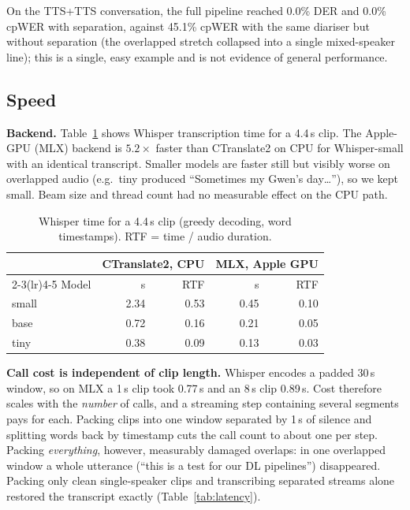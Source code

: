 \documentclass[conference]{IEEEtran}
\begin{document}
On the TTS+TTS conversation, the full pipeline reached 0.0\% DER and 0.0\% cpWER with separation, against 45.1\% cpWER with the same diariser but without separation (the overlapped stretch collapsed into a single mixed-speaker line); this is a single, easy example and is not evidence of general performance.

\subsection{Speed}\label{sec:latency}
\textbf{Backend.} Table~\ref{tab:asr} shows Whisper transcription time for a 4.4\,s clip. The Apple-GPU (MLX) backend is $5.2\times$ faster than CTranslate2 on CPU for Whisper-small with an identical transcript. Smaller models are faster still but visibly worse on overlapped audio (e.g.\ tiny produced ``Sometimes my Gwen's day\ldots''), so we kept small. Beam size and thread count had no measurable effect on the CPU path.

\begin{table}[t]
\caption{Whisper time for a 4.4\,s clip (greedy decoding, word timestamps). RTF = time / audio duration.}
\label{tab:asr}
\centering\footnotesize\setlength{\tabcolsep}{3.5pt}
\begin{tabular}{@{}lrrrr@{}}
\toprule
& \multicolumn{2}{c}{CTranslate2, CPU} & \multicolumn{2}{c}{MLX, Apple GPU} \\
\cmidrule(lr){2-3}\cmidrule(lr){4-5}
Model & s & RTF & s & RTF \\
\midrule
small & 2.34 & 0.53 & 0.45 & 0.10 \\
base  & 0.72 & 0.16 & 0.21 & 0.05 \\
tiny  & 0.38 & 0.09 & 0.13 & 0.03 \\
\bottomrule
\end{tabular}
\end{table}

\textbf{Call cost is independent of clip length.} Whisper encodes a padded 30\,s window, so on MLX a 1\,s clip took 0.77\,s and an 8\,s clip 0.89\,s. Cost therefore scales with the \emph{number} of calls, and a streaming step containing several segments pays for each. Packing clips into one window separated by 1\,s of silence and splitting words back by timestamp cuts the call count to about one per step. Packing \emph{everything}, however, measurably damaged overlaps: in one overlapped window a whole utterance (``this is a test for our DL pipelines'') disappeared. Packing only clean single-speaker clips and transcribing separated streams alone restored the transcript exactly (Table~\ref{tab:latency}).
\end{document}

